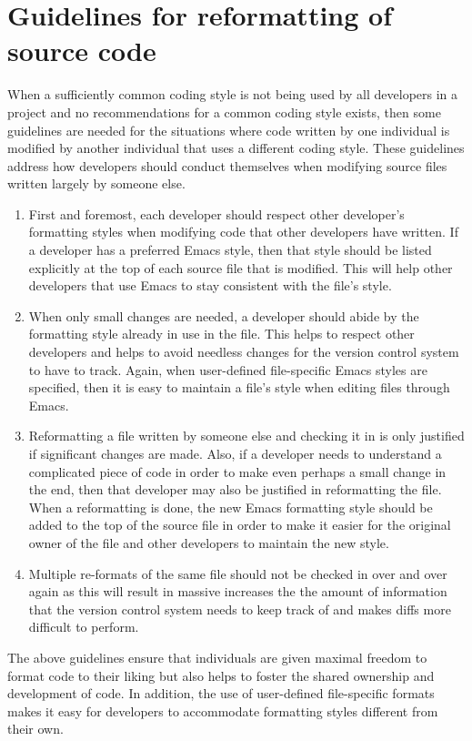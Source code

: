 %
\section{Guidelines for reformatting of source code}
\label{sec:reformatting-guidelines}
%

When a sufficiently common coding style is not being used by all developers in
a project and no recommendations for a common coding style exists, then some
guidelines are needed for the situations where code written by one individual
is modified by another individual that uses a different coding style.  These
guidelines address how developers should conduct themselves when modifying
source files written largely by someone else.

\begin{enumerate}

{}\item First and foremost, each developer should respect other developer's
formatting styles when modifying code that other developers have written.  If
a developer has a preferred Emacs style, then that style should be listed
explicitly at the top of each source file that is modified.  This will help
other developers that use Emacs to stay consistent with the file's style.

{}\item When only small changes are needed, a developer should abide by the
formatting style already in use in the file.  This helps to respect other
developers and helps to avoid needless changes for the version control system
to have to track.  Again, when user-defined file-specific Emacs styles are
specified, then it is easy to maintain a file's style when editing files
through Emacs.

{}\item Reformatting a file written by someone else and checking it in is only
justified if significant changes are made.  Also, if a developer needs to
understand a complicated piece of code in order to make even perhaps a small
change in the end, then that developer may also be justified in reformatting
the file.  When a reformatting is done, the new Emacs formatting style should
be added to the top of the source file in order to make it easier for the
original owner of the file and other developers to maintain the new style.

{}\item Multiple re-formats of the same file should not be checked in over and
over again as this will result in massive increases the the amount of
information that the version control system needs to keep track of and makes
diffs more difficult to perform.

\end{enumerate}

The above guidelines ensure that individuals are given maximal freedom to
format code to their liking but also helps to foster the shared ownership and
development of code.  In addition, the use of user-defined file-specific
formats makes it easy for developers to accommodate formatting styles
different from their own.
